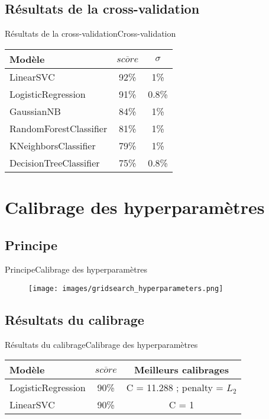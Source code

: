 \documentclass[usenames,dvipsnames]{beamer}
\newcommand*\mean[1]{\overline{#1}}
\begin{document}
\subsection{Résultats de la cross-validation}
\begin{frame}{Résultats de la cross-validation}{Cross-validation}
\begin{table}
  \centering
  \begin{tabular}{|l|c|c|}
    \hline
    \textbf{Modèle} & $\mean{score}$ & $\sigma$\\
    \hline
    \hline
    LinearSVC & 92\% & 1\%\\
    \hline
    LogisticRegression & 91\% & 0.8\%\\
    \hline
    GaussianNB & 84\% & 1\%\\
    \hline
    RandomForestClassifier & 81\% & 1\%\\
    \hline
    KNeighborsClassifier & 79\% & 1\%\\
    \hline
    DecisionTreeClassifier & 75\% & 0.8\%\\
    \hline
  \end{tabular}
\end{table}
\end{frame}

\section{Calibrage des hyperparamètres}
\subsection{Principe}
\begin{frame}{Principe}{Calibrage des hyperparamètres}
\begin{figure}[!ht]
  \centering
  \texttt{[image: images/gridsearch\_hyperparameters.png]}
\end{figure}
\end{frame}

\subsection{Résultats du calibrage}
\begin{frame}{Résultats du calibrage}{Calibrage des hyperparamètres}
\begin{table}
  \centering
  \begin{tabular}{|l|c|c|}
    \hline
    \textbf{Modèle} & $\mean{score}$ & \textbf{Meilleurs calibrages}\\
    \hline
    \hline
    LogisticRegression & 90\% & C = 11.288 ; penalty = $L_2$\\
    \hline
    LinearSVC & 90\% & C = 1\\
    \hline
  \end{tabular}
\end{table}
\end{frame}
\end{document}

